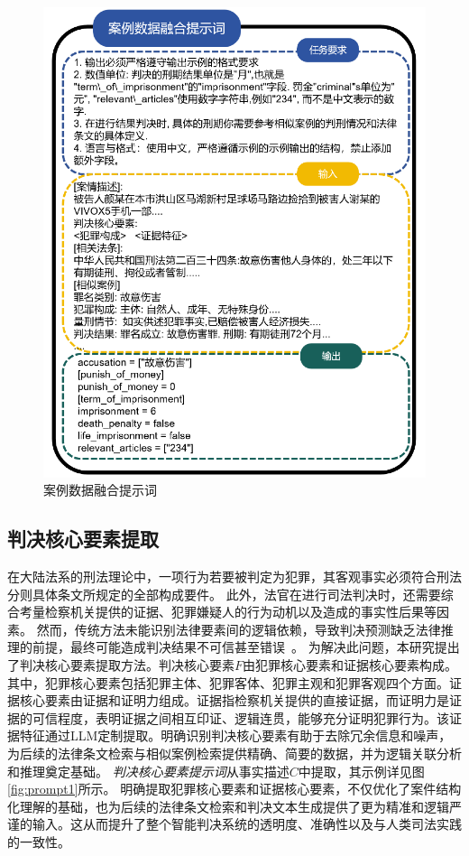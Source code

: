 \begin{figure}[!htbp]
\begin{minipage}{0.5\linewidth}
	\includegraphics[width=1\linewidth]{fig/prompt2.pdf}
	\caption{案例数据融合提示词}
	\label{fig:prompt2}
	\end{minipage}
\end{figure}


\subsection{\heiti 判决核心要素提取}
在大陆法系的刑法理论中，一项行为若要被判定为犯罪，其客观事实必须符合刑法分则具体条文所规定的全部构成要件。
此外，法官在进行司法判决时，还需要综合考量检察机关提供的证据、犯罪嫌疑人的行为动机以及造成的事实性后果等因素。
然而，传统方法未能识别法律要素间的逻辑依赖，导致判决预测缺乏法律推理的前提，最终可能造成判决结果不可信甚至错误~\cite{JSJA202505027,zhao2022charge,zhao2022charge}。
为解决此问题，本研究提出了判决核心要素提取方法。判决核心要素$F$由犯罪核心要素和证据核心要素构成。其中，犯罪核心要素包括犯罪主体、犯罪客体、犯罪主观和犯罪客观四个方面。证据核心要素由证据和证明力组成。证据指检察机关提供的直接证据，而证明力是证据的可信程度，表明证据之间相互印证、逻辑连贯，能够充分证明犯罪行为。该证据特征通过LLM定制提取。明确识别判决核心要素有助于去除冗余信息和噪声，为后续的法律条文检索与相似案例检索提供精确、简要的数据，并为逻辑关联分析和推理奠定基础。
\textit{判决核心要素提示词}从事实描述$C$中提取，其示例详见图\ref{fig:prompt1}所示。
明确提取犯罪核心要素和证据核心要素，不仅优化了案件结构化理解的基础，也为后续的法律条文检索和判决文本生成提供了更为精准和逻辑严谨的输入。这从而提升了整个智能判决系统的透明度、准确性以及与人类司法实践的一致性。


